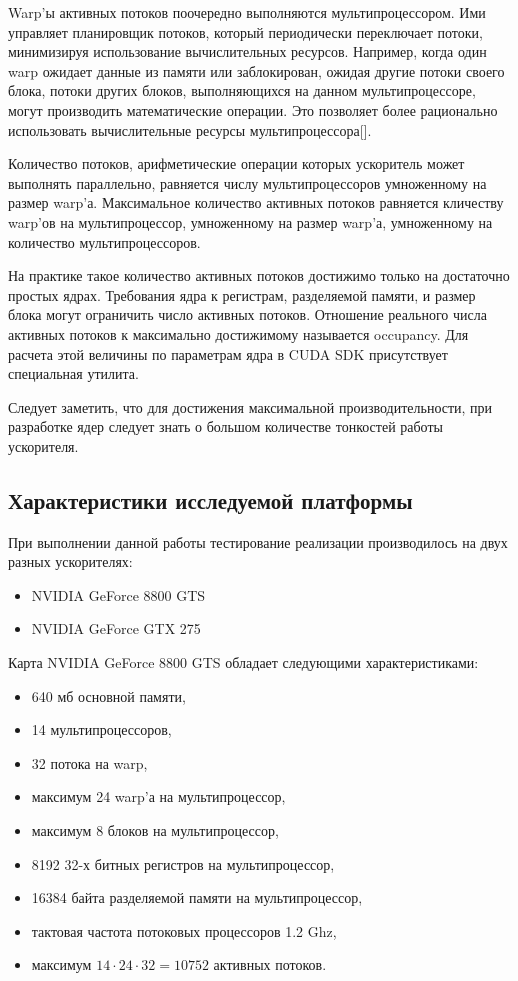 Warp'ы активных потоков поочередно выполняются мультипроцессором. Ими управляет планировщик потоков, который периодически переключает потоки, минимизируя использование вычислительных ресурсов. Например, когда один warp ожидает данные из памяти или заблокирован, ожидая другие потоки своего блока, потоки других блоков, выполняющихся на данном мультипроцессоре, могут производить математические операции. Это позволяет более рационально использовать вычислительные ресурсы мультипроцессора[].

Количество потоков, арифметические операции которых ускоритель может выполнять параллельно, равняется числу мультипроцессоров умноженному на размер warp'а. Максимальное количество активных потоков равняется кличеству warp'ов на мультипроцессор, умноженному на размер warp'а, умноженному на количество мультипроцессоров. 

На практике такое количество активных потоков достижимо только на достаточно простых ядрах. Требования ядра к регистрам, разделяемой памяти, и размер блока могут ограничить число активных потоков. Отношение реального числа активных потоков к максимально достижимому называется occupancy. Для расчета этой величины по параметрам ядра в CUDA SDK присутствует специальная утилита.

Следует заметить, что для достижения максимальной производительности, при разработке ядер следует знать о большом количестве тонкостей работы ускорителя.

\subsection{Характеристики исследуемой платформы}
При выполнении данной работы тестирование реализации производилось на двух разных ускорителях:
\begin{itemize}
\item NVIDIA GeForce 8800 GTS
\item NVIDIA GeForce GTX 275
\end{itemize}

 Карта NVIDIA GeForce 8800 GTS обладает следующими характеристиками:
 \begin{itemize}
\item 640 мб основной памяти,
\item 14 мультипроцессоров,
\item 32 потока на warp,
\item максимум 24 warp'а на мультипроцессор,
\item максимум 8 блоков на мультипроцессор,
\item 8192 32-х битных регистров на мультипроцессор,
\item 16384 байта разделяемой памяти на мультипроцессор,
\item тактовая частота потоковых процессоров 1.2 Ghz,
\item максимум $14 \cdot 24\cdot 32 = 10752$ активных потоков.
 \end{itemize}

